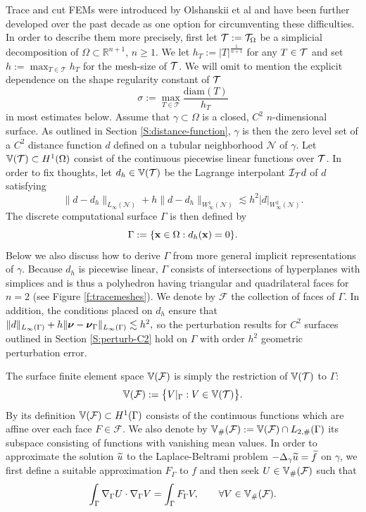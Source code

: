 Trace and cut FEMs were introduced by Olshanskii et al \cite{ORG09} and have been further developed over the past decade as one option for circumventing these difficulties.  In order to describe them more precisely, first let $\mathcal{T}:=\mathcal{T}_\Omega$ be a  simplicial decomposition of $\Omega \subset \mathbb{R}^{n+1}$, $n\ge1$.
We let $h_T:=| T |^{\frac 1 {n+1}}$ for any $T\in\mathcal{T}$ and set $h:=\max_{T\in \mathcal T} h_T$ for the mesh-size of $\mathcal{T}$.
We will omit to mention the explicit dependence on the shape regularity constant of $\mathcal{T}$
$$
\sigma := \max_{T\in \mathcal T} \frac{\textrm{diam}(T)}{h_T}
$$
in most estimates below.
Assume that $\gamma \subset \Omega$ is a closed, $C^2$ $n$-dimensional surface.  As outlined in Section \ref{S:distance-function}, $\gamma$ is then the zero level set of a $C^2$ distance function $d$ defined on a tubular neighborhood $\mathcal{N}$ of $\gamma$. Let $\mathbb{V}(\mathcal T) \subset H^1(\Omega)$ consist of the continuous piecewise linear functions over $\mathcal{T}$.   In order to fix thoughts, let $d_h \in \mathbb{V}(\mathcal T)$ be the Lagrange interpolant $\mathcal{I}_{\mathcal{T}} d$ of $d$ satisfying
\[
\|d-d_h\|_{L_\infty(\mathcal{N})} + h \|d-d_h\|_{W_\infty^1(\mathcal{N})}
\lesssim h^2 |d|_{W^2_\infty(\mathcal{N})}.
\]
%
The discrete computational surface $\Gamma$ is then defined by 
$$
\Gamma := \{{\bf x} \in \Omega : d_h({\bf x})=0\}.
$$
%
Below we also discuss how to derive $\Gamma$ from more general implicit representations of $\gamma$. 
Because $d_h$ is piecewise linear, $\Gamma$ consists of intersections of hyperplanes with simplices and is thus a polyhedron having triangular and quadrilateral faces for $n=2$ (see Figure \ref{f:tracemeshes}).
We denote by $\mathcal{F}$ the collection of faces of $\Gamma$.
In addition, the conditions placed on $d_h$ ensure that $\|d\|_{L_\infty(\Gamma)} + h \|{\boldsymbol \nu}-{\boldsymbol \nu}_\Gamma\|_{L_\infty(\Gamma)} \lesssim h^2,$
so the perturbation results for $C^2$ surfaces outlined in Section \ref{S:perturb-C2} hold on $\Gamma$ with order $h^2$ geometric perturbation error.

The surface finite element space $\mathbb{V}(\mathcal F)$ is simply the restriction of $\mathbb{V}(\mathcal T)$ to $\Gamma$:  
%
\[
\mathbb{V}(\mathcal F) := \big\{ V|_\Gamma:  V\in \mathbb{V}(\mathcal T)    \big\}.
\]
By its definition $\mathbb{V}(\mathcal F)\subset H^1(\Gamma) $ consists of the continuous functions which are affine over each face $F \in \mathcal{F}$.
We also denote by $\mathbb{V}_\#(\mathcal F) := \mathbb{V}(\mathcal F) \cap L_{2,\#}(\Gamma)$ its subspace consisting of functions with vanishing mean values.
%
In order to approximate the solution $\widetilde{u}$ to the Laplace-Beltrami problem $-\Delta_\gamma \widetilde{u} =\widetilde f$ on $\gamma$, we first define a suitable approximation $F_\Gamma$ to $f$ and then seek $U \in \mathbb{V}_\#(\mathcal F)$ such that 
\begin{align}
\label{def:trace_fem}\int_\Gamma \nabla_\Gamma U \cdot \nabla_\Gamma V = \int_\Gamma F_\Gamma V, \qquad \forall V \in \mathbb{V}_\#(\mathcal F).
\end{align}

